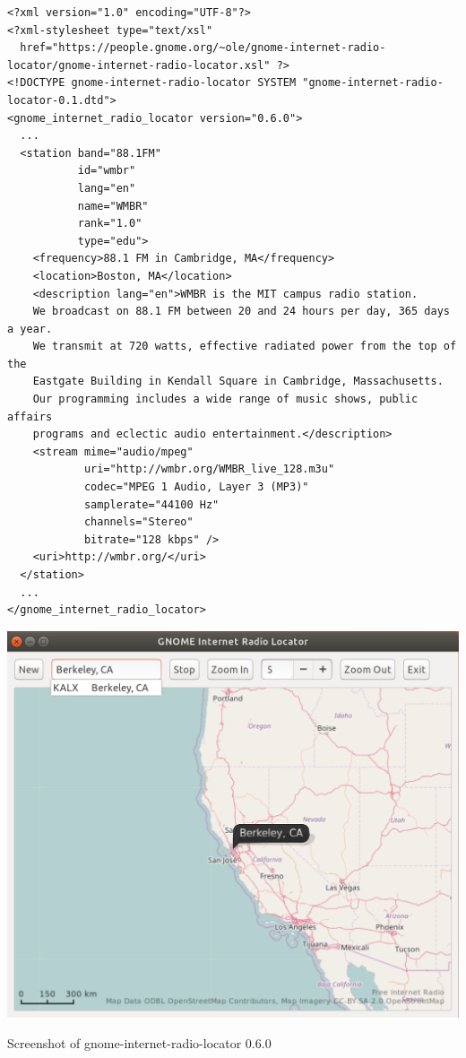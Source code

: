 \documentclass[20pt,landscape]{foils}
\begin{document}
\begin{tiny}
\begin{verbatim}
<?xml version="1.0" encoding="UTF-8"?>
<?xml-stylesheet type="text/xsl"
  href="https://people.gnome.org/~ole/gnome-internet-radio-locator/gnome-internet-radio-locator.xsl" ?>
<!DOCTYPE gnome-internet-radio-locator SYSTEM "gnome-internet-radio-locator-0.1.dtd">
<gnome_internet_radio_locator version="0.6.0">
  ...
  <station band="88.1FM"
           id="wmbr"
           lang="en"
           name="WMBR"
           rank="1.0"
           type="edu">
    <frequency>88.1 FM in Cambridge, MA</frequency>
    <location>Boston, MA</location>
    <description lang="en">WMBR is the MIT campus radio station.
    We broadcast on 88.1 FM between 20 and 24 hours per day, 365 days a year.
    We transmit at 720 watts, effective radiated power from the top of the
    Eastgate Building in Kendall Square in Cambridge, Massachusetts.
    Our programming includes a wide range of music shows, public affairs
    programs and eclectic audio entertainment.</description>
    <stream mime="audio/mpeg"
            uri="http://wmbr.org/WMBR_live_128.m3u"
            codec="MPEG 1 Audio, Layer 3 (MP3)"
            samplerate="44100 Hz"
            channels="Stereo"
            bitrate="128 kbps" />
    <uri>http://wmbr.org/</uri>
  </station>
  ...
</gnome_internet_radio_locator>
\end{verbatim}
\end{tiny}


\begin{center}

  \colorbox{white}{\includegraphics[width=0.6\hsize]{../data/screenshot.png}}

  {\blueem Screenshot of gnome-internet-radio-locator 0.6.0}

\end{center}
\end{document}
